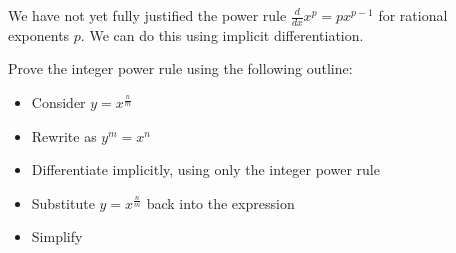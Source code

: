 \documentclass{ximera}
\author{Steven Gubkin}
\begin{document}
\begin{exercise}



We have not yet fully justified the power rule $\frac{d}{dx} x^p = px^{p-1}$ for rational exponents $p$.  We can do this  using implicit differentiation.

Prove the integer power rule using the following outline:

\begin{itemize}
\item Consider $y = x^{\frac{n}{m}}$
\item Rewrite as $y^m = x^n$
\item Differentiate implicitly, using only the integer power rule
\item Substitute $y = x^\frac{n}{m}$ back into the expression
\item Simplify
\end{itemize}

\end{exercise}
\end{document}
